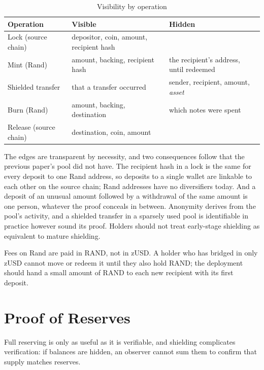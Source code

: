 \documentclass[11pt,a4paper]{article}
\begin{document}
\begin{table}[t]
\centering
\caption{Visibility by operation}
\small
\begin{tabular}{@{}lp{5.0cm}p{4.6cm}@{}}
\toprule
\textbf{Operation} & \textbf{Visible} & \textbf{Hidden} \\ \midrule
Lock (source chain) & depositor, coin, amount, recipient hash & \\
Mint (Rand) & amount, backing, recipient hash & the recipient's address, until redeemed \\
Shielded transfer & that a transfer occurred & sender, recipient, amount, \emph{asset} \\
Burn (Rand) & amount, backing, destination & which notes were spent \\
Release (source chain) & destination, coin, amount & \\ \bottomrule
\end{tabular}
\end{table}

The edges are transparent by necessity, and two consequences follow that the previous paper's pool did not have. The recipient hash in a lock is the same for every deposit to one Rand address, so deposits to a single wallet are linkable to each other on the source chain; Rand addresses have no diversifiers today. And a deposit of an unusual amount followed by a withdrawal of the same amount is one person, whatever the proof conceals in between. Anonymity derives from the pool's activity, and a shielded transfer in a sparsely used pool is identifiable in practice however sound its proof. Holders should not treat early-stage shielding as equivalent to mature shielding.

Fees on Rand are paid in RAND, not in zUSD. A holder who has bridged in only zUSD cannot move or redeem it until they also hold RAND; the deployment should hand a small amount of RAND to each new recipient with its first deposit.

\section{Proof of Reserves}

Full reserving is only as useful as it is verifiable, and shielding complicates verification: if balances are hidden, an observer cannot sum them to confirm that supply matches reserves.
\end{document}
